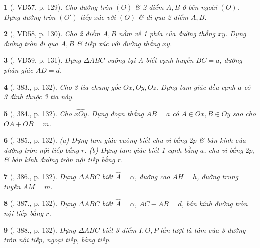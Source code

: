\documentclass{article}
\newtheorem{baitoan}{}
\begin{document}
\begin{baitoan}[\cite{Binh_Toan_9_tap_2}, VD57, p. 129]
	Cho đường tròn $(O)$ \& 2 điểm $A,B$ ở bên ngoài $(O)$. Dựng đường tròn $(O')$ tiếp xúc với $(O)$ \& đi qua 2 điểm $A,B$.
\end{baitoan}

\begin{baitoan}[\cite{Binh_Toan_9_tap_2}, VD58, p. 130]
	Cho 2 điểm $A,B$ nằm về 1 phía của đường thẳng $xy$. Dựng đường tròn đi qua $A,B$ \& tiếp xúc với đường thẳng $xy$.
\end{baitoan}
\begin{baitoan}[\cite{Binh_Toan_9_tap_2}, VD59, p. 131]
	Dựng $\Delta ABC$ vuông tại A biết cạnh huyền $BC = a$, đường phân giác $AD = d$.
\end{baitoan}

\begin{baitoan}[\cite{Binh_Toan_9_tap_2}, 383., p. 132]
	Cho 3 tia chung gốc $Ox,Oy,Oz$. Dựng tam giác đều cạnh $a$ có 3 đỉnh thuộc 3 tia này.
\end{baitoan}

\begin{baitoan}[\cite{Binh_Toan_9_tap_2}, 384., p. 132]
	Cho $\widehat{xOy}$. Dựng đoạn thẳng $AB = a$ có $A\in Ox,B\in Oy$ sao cho $OA + OB = m$.
\end{baitoan}

\begin{baitoan}[\cite{Binh_Toan_9_tap_2}, 385., p. 132]
	(a) Dựng tam giác vuông biết chu vi bằng $2p$ \& bán kính của đường tròn nội tiếp bằng $r$. (b) Dựng tam giác biết 1 cạnh bằng $a$, chu vi bằng $2p$, \& bán kính đường tròn nội tiếp bằng $r$.
\end{baitoan}

\begin{baitoan}[\cite{Binh_Toan_9_tap_2}, 386., p. 132]
	Dựng $\Delta ABC$ biết $\widehat{A} = \alpha$, đường cao $AH = h$, đường trung tuyến $AM = m$.
\end{baitoan}

\begin{baitoan}[\cite{Binh_Toan_9_tap_2}, 387., p. 132]
	Dựng $\Delta ABC$ biết $\widehat{A} = \alpha$, $AC - AB = d$, bán kính đường tròn nội tiếp bằng $r$.
\end{baitoan}

\begin{baitoan}[\cite{Binh_Toan_9_tap_2}, 388., p. 132]
	Dựng $\Delta ABC$ biết 3 điểm $I,O,P$ lần lượt là tâm của 3 đường tròn nội tiếp, ngoại tiếp, bàng tiếp.
\end{baitoan}
\end{document}
